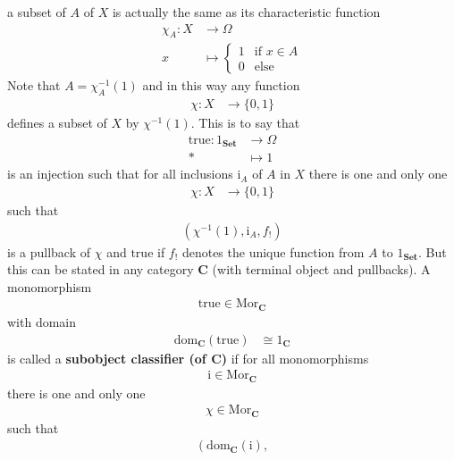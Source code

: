 \begin{exa}
\begin{enumerate}
a subset of $A$ of $X$ is actually the same as its characteristic function
\begin{align*}
  \chi_{A}
  \colon
  X
  &\rightarrow
  \Omega
  \\
  x
  &\mapsto
  \begin{cases}
    1
    &
    \text{if }
    x
    \in
    A
    \\
    0
    &
    \text{else}
  \end{cases}
\end{align*}
Note that $A = \chi_{A}^{-1}(1)$ and in this way any function
\begin{align*}
  \chi
  \colon
  X
  &\rightarrow
  \lbrace
    0,
    1
  \rbrace
\end{align*}
defines a subset of $X$ by $\chi^{-1}(1)$. This is to say that
\begin{align*}
  \mathrm{true}
  \colon
  1_{\mathbf{Set}}
  &\rightarrow
  \Omega
  \\
  \ast
  &\mapsto
  1
\end{align*}
is an injection such that for all inclusions $\mathrm{i}_{A}$ of $A$ in $X$ there is one and only one
\begin{align*}
  \chi
  \colon
  X
  &\rightarrow
  \lbrace
    0,
    1
  \rbrace
\end{align*}
such that
\begin{align*}
  \left(
    \chi^{-1}(1),
    \mathrm{i}_{A},
    f_{!}
  \right)
\end{align*}
is a pullback of $\chi$ and $\mathrm{true}$ if $f_{!}$ denotes the unique function from $A$ to $1_{\mathbf{Set}}$. But this can be stated in any category $\mathbf{C}$ (with terminal object and pullbacks). A monomorphism
\begin{align*}
  \mathrm{true}
  \in
  \mathrm{Mor}_{\mathbf{C}}
\end{align*}
with domain
\begin{align*}
  \mathrm{dom}_{\mathbf{C}}(\mathrm{true})
  &\cong
  1_{\mathbf{C}}
\end{align*}
is called a \textbf{subobject classifier (of $\mathbf{C}$)} if for all monomorphisms
\begin{align*}
  \mathrm{i}
  \in
  \mathrm{Mor}_{\mathbf{C}}
\end{align*}
there is one and only one
\begin{align*}
  \chi
  \in
  \mathrm{Mor}_{\mathbf{C}}
\end{align*}
such that
\begin{align*}
  \left(
    \mathrm{dom}_{\mathbf{C}}(\mathrm{i}),

\end{align*}
\end{enumerate}
\end{exa}
